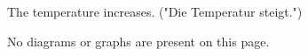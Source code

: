 The temperature increases. ("Die Temperatur steigt.")  

No diagrams or graphs are present on this page.